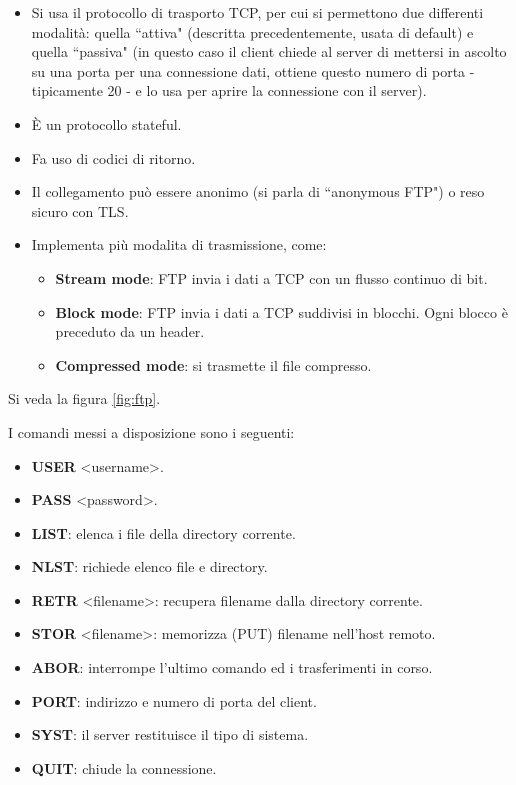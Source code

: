 \documentclass[11pt, italian, openany]{book}
\begin{document}
\begin{sloppypar}
\begin{itemize}[topsep=0pt, itemsep=0pt, parsep=0pt]
\begin{itemize}[topsep=0pt, itemsep=0pt, parsep=0pt]
		Il server apre una connessione dati TCP con il client (caveat: non \`e il client a farlo, si parla di ``modalit\`a attiva"), trasferisce il
		file sulla connessione dati e, terminata l'operazione, il server chiude la connessione. La connessione dati non \`e persistente, ne viene
		aperta e chiusa una per ciascun trasferimento.
		\item Si usa il protocollo di trasporto TCP, per cui si permettono due differenti modalit\`a: quella ``attiva" (descritta precedentemente,
		usata di default) e quella ``passiva" (in questo caso il client chiede al server di mettersi in ascolto su una porta per una connessione dati,
		ottiene questo numero di porta - tipicamente 20 - e lo usa per aprire la connessione con il server).
		\item \`E un protocollo stateful.
		\item Fa uso di codici di ritorno.
		\item Il collegamento pu\`o essere anonimo (si parla di ``anonymous FTP") o reso sicuro con TLS.
		\item Implementa pi\`u modalita di trasmissione, come:
		\begin{itemize}[topsep=0pt, itemsep=0pt, parsep=0pt]
			\item \textbf{Stream mode}: FTP invia i dati a TCP con un flusso continuo di bit.
			\item \textbf{Block mode}: FTP invia i dati a TCP suddivisi in blocchi. Ogni blocco è preceduto da un header.
			\item \textbf{Compressed mode}: si trasmette il file compresso.
			\end{itemize}
	\end{itemize}

	Si veda la figura \ref{fig:ftp}.

	I comandi messi a disposizione sono i seguenti:
	\begin{itemize}[topsep=0pt, itemsep=0pt, parsep=0pt]
		\item \textbf{USER} \textless{username}\textgreater{.}
		\item \textbf{PASS} \textless{password}\textgreater{.}
		\item \textbf{LIST}: elenca i file della directory corrente.
		\item \textbf{NLST}: richiede elenco file e directory.
		\item \textbf{RETR} \textless{filename}\textgreater{:} recupera filename dalla directory corrente.
		\item \textbf{STOR} \textless{filename}\textgreater{:} memorizza (PUT) filename nell'host remoto.
		\item \textbf{ABOR}: interrompe l’ultimo comando ed i trasferimenti in corso.
		\item \textbf{PORT}: indirizzo e numero di porta del client.
		\item \textbf{SYST}: il server restituisce il tipo di sistema.
		\item \textbf{QUIT}: chiude la connessione.
	\end{itemize}
\end{itemize}


\end{sloppypar}
\end{document}
